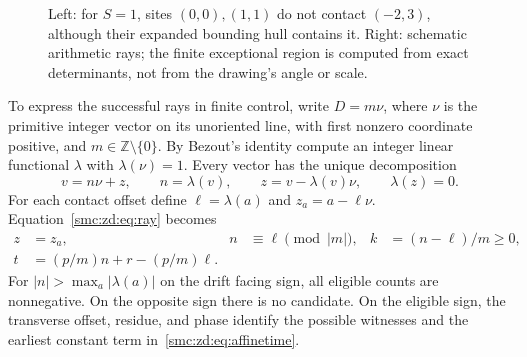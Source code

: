 \documentclass[11pt,letterpaper]{article}
\numberwithin{equation}{section}
\theoremstyle{definition}
\theoremstyle{remark}
\newcommand{\Z}{\mathbb Z}
\begin{document}
\begin{figure}[ht]
\centering
{}
\caption{Left: for $S=1$, sites $(0,0),(1,1)$ do not contact $(-2,3)$, although their expanded bounding hull contains it. Right: schematic arithmetic rays; the finite exceptional region is computed from exact determinants, not from the drawing's angle or scale.}\label{smc:zd:fig:geometry}
\end{figure}

To express the successful rays in finite control, write $D=m\nu$, where $\nu$ is the primitive integer vector on its unoriented line, with first nonzero coordinate positive, and $m\in\Z\setminus\{0\}$. By Bezout's identity compute an integer linear functional $\lambda$ with $\lambda(\nu)=1$. Every vector has the unique decomposition
\[
 v=n\nu+z,\qquad n=\lambda(v),\qquad z=v-\lambda(v)\nu,\qquad\lambda(z)=0.
\]
For each contact offset define $\ell=\lambda(a)$ and $z_a=a-\ell\nu$. Equation~\eqref{smc:zd:eq:ray} becomes
\begin{align}
 z&=z_a,& n&\equiv\ell\pmod{|m|},& k&=(n-\ell)/m\ge0,\label{smc:zd:eq:residue}\\
 t&=(p/m)n+r-(p/m)\ell.&&&&\label{smc:zd:eq:affinetime}
\end{align}
For $|n|>\max_a|\lambda(a)|$ on the drift facing sign, all eligible counts are nonnegative. On the opposite sign there is no candidate. On the eligible sign, the transverse offset, residue, and phase identify the possible witnesses and the earliest constant term in~\eqref{smc:zd:eq:affinetime}.
\end{document}
